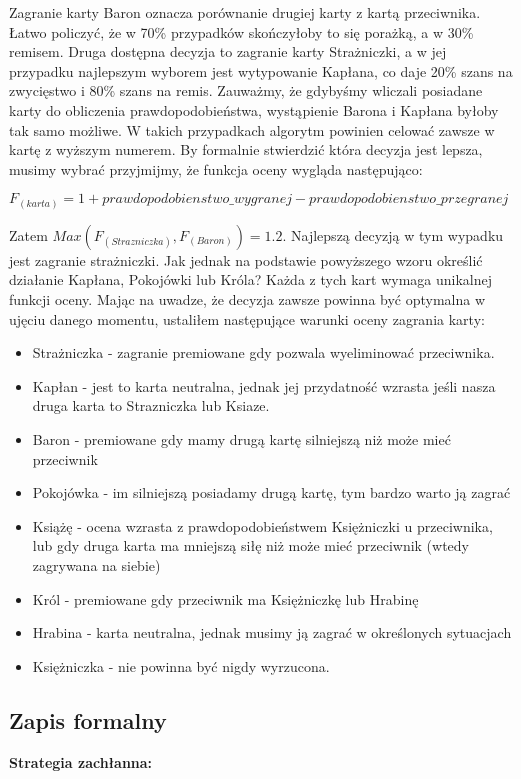 Zagranie karty Baron oznacza porównanie drugiej karty z kartą przeciwnika. Łatwo policzyć, że w 70\% przypadków skończyłoby to się porażką, a w 30\% remisem. Druga dostępna decyzja to zagranie karty Strażniczki, a w jej przypadku najlepszym wyborem jest wytypowanie Kapłana, co daje 20\% szans na zwycięstwo i 80\% szans na remis. Zauważmy, że gdybyśmy wliczali posiadane karty do obliczenia prawdopodobieństwa, wystąpienie Barona i Kapłana byłoby tak samo możliwe. W takich przypadkach algorytm powinien celować zawsze w kartę z wyższym numerem. By formalnie stwierdzić która decyzja jest lepsza, musimy wybrać  przyjmijmy, że funkcja oceny wygląda następująco:

\begin{center}
	$F_{(karta)} = 1 + prawdopodobienstwo\_wygranej - prawdopodobienstwo\_przegranej$
\end{center}

Zatem $Max(F_{(Strazniczka)}, F_{(Baron)}) = 1.2$. Najlepszą decyzją w tym wypadku jest zagranie strażniczki. Jak jednak na podstawie powyższego wzoru określić działanie Kapłana, Pokojówki lub Króla? Każda z tych kart wymaga unikalnej funkcji oceny. Mając na uwadze, że decyzja zawsze powinna być optymalna w ujęciu danego momentu, ustaliłem następujące warunki oceny zagrania karty:
\begin{itemize}
	\item Strażniczka - zagranie premiowane gdy pozwala wyeliminować przeciwnika.
	\item Kapłan - jest to karta neutralna, jednak jej przydatność wzrasta jeśli nasza druga karta to Strazniczka lub Ksiaze.
	\item Baron - premiowane gdy mamy drugą kartę silniejszą niż może mieć przeciwnik
	\item Pokojówka - im silniejszą posiadamy drugą kartę, tym bardzo warto ją zagrać
	\item Książę - ocena wzrasta z prawdopodobieństwem Księżniczki u przeciwnika, lub gdy druga karta ma mniejszą siłę niż może mieć przeciwnik (wtedy zagrywana na siebie)
	\item Król - premiowane gdy przeciwnik ma Księżniczkę lub Hrabinę
	\item Hrabina - karta neutralna, jednak musimy ją zagrać w określonych sytuacjach
	\item Księżniczka - nie powinna być nigdy wyrzucona.
\end{itemize}

\subsection{Zapis formalny}
\textbf{Strategia zachłanna:}

